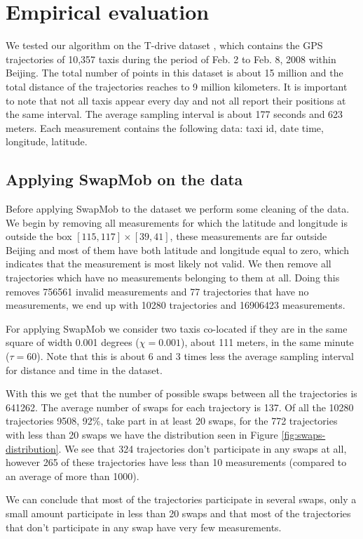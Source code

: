 \documentclass{llncs}
\begin{document}
\section{Empirical evaluation}
We tested our algorithm on the T-drive dataset
\cite{Yuan2010},\cite{Yuan2011} which contains the GPS trajectories of
10,357 taxis during the period of Feb. 2 to Feb. 8, 2008 within
Beijing. The total number of points in this dataset is about 15
million and the total distance of the trajectories reaches to 9
million kilometers. It is important to note that not all taxis appear
every day and not all report their positions at the same interval. The
average sampling interval is about 177 seconds and 623 meters. Each
measurement contains the following data: taxi id, date time,
longitude, latitude.

\subsection{Applying SwapMob on the data}
Before applying SwapMob to the dataset we perform some cleaning of the
data. We begin by removing all measurements for which the latitude and
longitude is outside the box $[115, 117] \times [39, 41]$, these
measurements are far outside Beijing and most of them have both
latitude and longitude equal to zero, which indicates that the
measurement is most likely not valid. We then remove all trajectories
which have no measurements belonging to them at all. Doing this
removes 756561 invalid measurements and 77 trajectories that have no
measurements, we end up with 10280 trajectories and 16906423
measurements.

For applying SwapMob we consider two taxis co-located if they are in
the same square of width 0.001 degrees ($\chi = 0.001$), about 111
meters, in the same minute ($\tau = 60$). Note that this is about 6
and 3 times less the average sampling interval for distance and time
in the dataset.

With this we get that the number of possible swaps between all the
trajectories is 641262. The average number of swaps for each
trajectory is 137. Of all the 10280 trajectories 9508, 92\%, take part
in at least 20 swaps, for the 772 trajectories with less than 20 swaps
we have the distribution seen in Figure \ref{fig:swaps-distribution}.
We see that 324 trajectories don't participate in any swaps at all,
however 265 of these trajectories have less than 10 measurements
(compared to an average of more than 1000).

We can conclude that most of the trajectories participate in several
swaps, only a small amount participate in less than 20 swaps and that
most of the trajectories that don't participate in any swap have very
few measurements.
\end{document}
